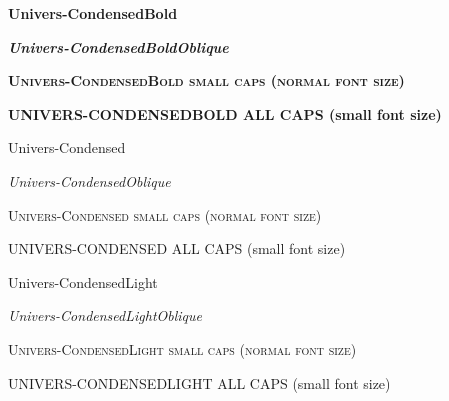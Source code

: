 \documentclass{article}
\begin{document}
\renewcommand\sfdefault{fun}

\textsf{\bfseries Univers-CondensedBold}

\textsf{\slshape \bfseries Univers-CondensedBoldOblique}

\textsf{\scshape \bfseries Univers-CondensedBold small caps (normal font size)}

\textsf{\small \bfseries UNIVERS-CONDENSEDBOLD ALL CAPS (small font size)}

\rule[0in]{0in}{0.25in}

\textsf{Univers-Condensed}

\textsf{\slshape Univers-CondensedOblique}

\textsf{\scshape Univers-Condensed small caps (normal font size)}

\textsf{\small UNIVERS-CONDENSED ALL CAPS (small font size)}

\rule[0in]{0in}{0.25in}

\selectfont

\textsf{Univers-CondensedLight}

\textsf{\slshape Univers-CondensedLightOblique}

\textsf{\scshape Univers-CondensedLight small caps (normal font size)}

\textsf{\small UNIVERS-CONDENSEDLIGHT ALL CAPS (small font size)}
\end{document}
